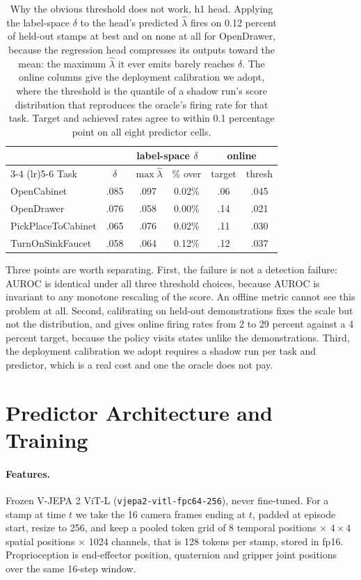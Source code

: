 \begin{table}[h]
\centering
\small
\setlength{\tabcolsep}{4pt}
\begin{tabular}{lccccc}
\toprule
& & \multicolumn{2}{c}{label-space $\delta$} & \multicolumn{2}{c}{online} \\
\cmidrule(lr){3-4} \cmidrule(lr){5-6}
Task & $\delta$ & $\max \hat\lambda$ & \% over & target & thresh \\
\midrule
OpenCabinet & .085 & .097 & 0.02\% & .06 & .045 \\
OpenDrawer & .076 & .058 & 0.00\% & .14 & .021 \\
PickPlaceToCabinet & .065 & .076 & 0.02\% & .11 & .030 \\
TurnOnSinkFaucet & .058 & .064 & 0.12\% & .12 & .037 \\
\bottomrule
\end{tabular}
\caption{Why the obvious threshold does not work, h1 head. Applying the
label-space $\delta$ to the head's predicted $\hat\lambda$ fires on 0.12
percent of held-out stamps at best and on none at all for OpenDrawer, because
the regression head compresses its outputs toward the mean: the maximum
$\hat\lambda$ it ever emits barely reaches $\delta$. The online columns give
the deployment calibration we adopt, where the threshold is the quantile of a
shadow run's score distribution that reproduces the oracle's firing rate for
that task. Target and achieved rates agree to within 0.1 percentage point on
all eight predictor cells.}
\label{tab:thresh}
\end{table}

Three points are worth separating. First, the failure is not a detection
failure: AUROC is identical under all three threshold choices, because AUROC is
invariant to any monotone rescaling of the score. An offline metric cannot see
this problem at all. Second, calibrating on held-out demonstrations fixes the
scale but not the distribution, and gives online firing rates from 2 to 29
percent against a 4 percent target, because the policy visits states unlike the
demonstrations. Third, the deployment calibration we adopt requires a shadow
run per task and predictor, which is a real cost and one the oracle does not
pay.

\section{Predictor Architecture and Training}
\label{app:predictor}

\paragraph{Features.}
Frozen V-JEPA 2 ViT-L (\texttt{vjepa2-vitl-fpc64-256}), never fine-tuned. For a
stamp at time $t$ we take the 16 camera frames ending at $t$, padded at episode
start, resize to 256, and keep a pooled token grid of 8 temporal positions
$\times$ $4{\times}4$ spatial positions $\times$ 1024 channels, that is 128
tokens per stamp, stored in fp16. Proprioception is end-effector position,
quaternion and gripper joint positions over the same 16-step window.

